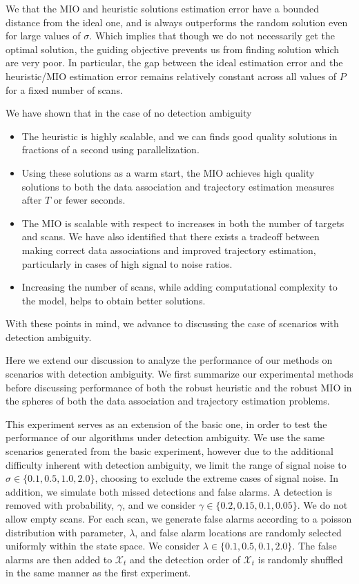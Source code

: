We that the MIO and heuristic solutions estimation error have a bounded distance from the ideal one, and is always outperforms the random solution even for large values of $\sigma$. Which implies that though we do not necessarily get the optimal solution, the guiding objective prevents us from finding solution which are very poor. In particular, the gap between the ideal estimation error and the heuristic/MIO estimation error remains relatively constant across all values of $P$ for a fixed number of scans. 

We have shown that in the case of no detection ambiguity
\begin{itemize}
\item The heuristic is highly scalable, and we can finds good quality solutions in fractions of a second using parallelization. 
\item Using these solutions as a warm start, the MIO achieves high quality solutions to both the data association and trajectory estimation measures after $T$ or fewer seconds. 
\item The MIO is scalable with respect to increases in both the number of targets and scans. We have also identified that there exists a tradeoff between making correct data associations and improved trajectory estimation, particularly in cases of high signal to noise ratios. 
\item Increasing the number of scans, while adding computational complexity to the model, helps to obtain better solutions. 
\end{itemize}
With these points in mind, we advance to discussing the case of scenarios with detection ambiguity. 

Here we extend our discussion to analyze the performance of our methods on scenarios with detection ambiguity. We first summarize our experimental methods before discussing performance of both the robust heuristic and the robust MIO in the spheres of both the data association and trajectory estimation problems.

This experiment serves as an extension of the basic one, in order to test the performance of our algorithms under detection ambiguity. We use the same scenarios generated from the basic experiment, however due to the additional difficulty inherent with detection ambiguity, we limit the range of signal noise to $\sigma \in \{0.1,0.5,1.0,2.0\}$, choosing to exclude the extreme cases of signal noise. In addition, we simulate both missed detections and false alarms. A detection is removed with probability, $\gamma$, and we consider $\gamma \in \{0.2,0.15,0.1,0.05\}$. We do not allow empty scans. For each scan, we generate false alarms according to a poisson distribution with parameter, $\lambda$, and false alarm locations are randomly selected uniformly within the state space. We consider $\lambda \in \{0.1,0.5,0.1,2.0\}$. The false alarms are then added to $\mathcal{X}_{t}$ and the detection order of $\mathcal{X}_{t}$ is randomly shuffled in the same manner as the first experiment. 


